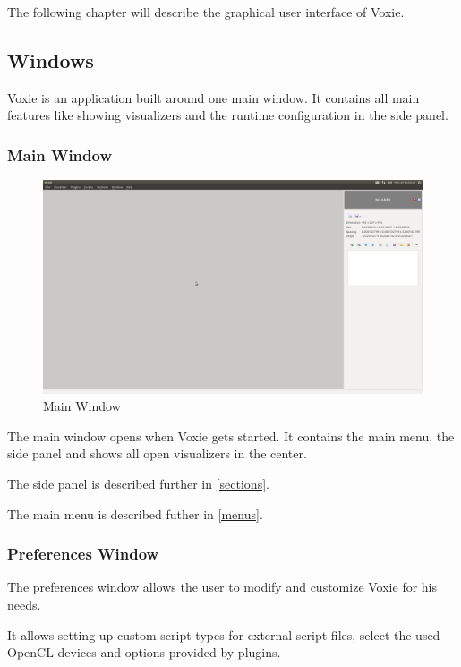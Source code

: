 
The following chapter will describe the graphical user interface of Voxie.

\subsection{Windows}

Voxie is an application built around one main window. It contains all main
features like showing visualizers and the runtime configuration in the
side panel.

\subsubsection{Main Window}

\begin{figure}[h]
	\caption{Main Window}
	\centering
	\includegraphics[width=1.0\textwidth]{img/mainwindow.png}
\end{figure}

The main window opens when Voxie gets started. It contains the main menu,
the side panel and shows all open visualizers in the center.

The side panel is described further in \ref{sections}.

The main menu is described futher in \ref{menus}.

\subsubsection{Preferences Window}
\label{preferences-window}

The preferences window allows the user to modify and customize Voxie for
his needs.

It allows setting up custom script types for external script files, select the
used OpenCL devices and options provided by plugins.


